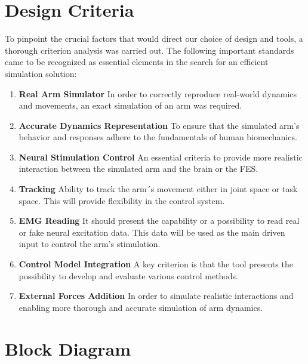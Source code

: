 \section{Design Criteria}

To pinpoint the crucial factors that would direct our choice of design and tools, a thorough criterion analysis was carried out. The following important standards came to be recognized as essential elements in the search for an efficient simulation solution:

\begin{enumerate}
    \item \textbf{Real Arm Simulator} In order to correctly reproduce real-world dynamics and movements, an exact simulation of an arm was required.
    \item \textbf{Accurate Dynamics Representation} To ensure that the simulated arm's behavior and responses adhere to the fundamentals of human biomechanics.
    \item \textbf{Neural Stimulation Control} An essential criteria to provide more realistic interaction between the simulated arm and the brain or the FES.
    \item \textbf{Tracking} Ability to track the arm´s movement either in joint space or task space. This will provide flexibility in the control system.
    \item \textbf{EMG Reading} It should present the capability or a possibility to read real or fake neural excitation data. This data will be used as the main driven input to control the arm's stimulation.
    \item \textbf{Control Model Integration} A key criterion is that the tool presents the possibility to develop and evaluate various control methods.
    \item \textbf{External Forces Addition} In order to simulate realistic interactions and enabling more thorough and accurate simulation of arm dynamics.
    
\end{enumerate}



\section{Block Diagram}

